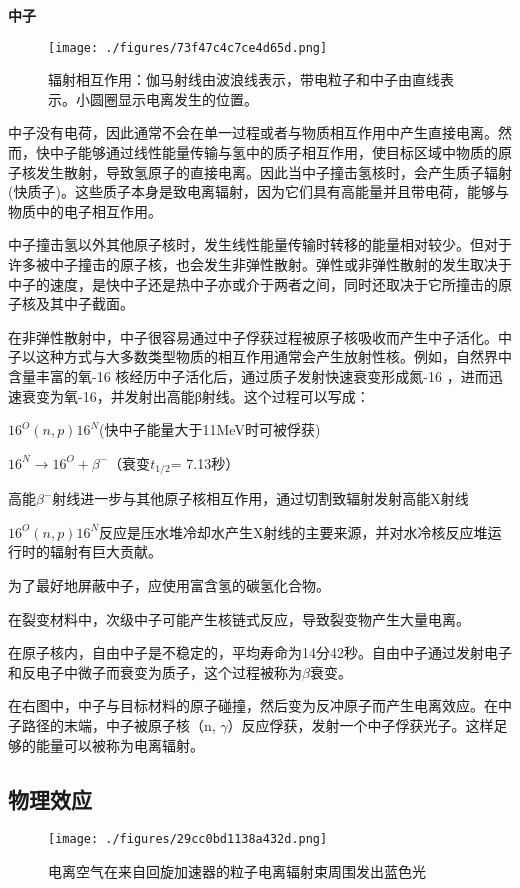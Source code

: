 \textbf{中子}

\begin{figure}[ht]
\centering
\texttt{[image: ./figures/73f47c4c7ce4d65d.png]}
\caption{辐射相互作用：伽马射线由波浪线表示，带电粒子和中子由直线表示。小圆圈显示电离发生的位置。} \label{fig_DLFS_5}
\end{figure}
中子没有电荷，因此通常不会在单一过程或者与物质相互作用中产生直接电离。然而，快中子能够通过线性能量传输与氢中的质子相互作用，使目标区域中物质的原子核发生散射，导致氢原子的直接电离。因此当中子撞击氢核时，会产生质子辐射(快质子)。这些质子本身是致电离辐射，因为它们具有高能量并且带电荷，能够与物质中的电子相互作用。

中子撞击氢以外其他原子核时，发生线性能量传输时转移的能量相对较少。但对于许多被中子撞击的原子核，也会发生非弹性散射。弹性或非弹性散射的发生取决于中子的速度，是快中子还是热中子亦或介于两者之间，同时还取决于它所撞击的原子核及其中子截面。

在非弹性散射中，中子很容易通过中子俘获过程被原子核吸收而产生中子活化。中子以这种方式与大多数类型物质的相互作用通常会产生放射性核。例如，自然界中含量丰富的氧-16 核经历中子活化后，通过质子发射快速衰变形成氮-16 ，进而迅速衰变为氧-16，并发射出高能β射线。这个过程可以写成：

$16^O (n,p)16^N$(快中子能量大于11MeV时可被俘获)

$16^N \to 16^O + \beta^-$（衰变$t_{1/2}$= 7.13秒）

高能$\beta^-$射线进一步与其他原子核相互作用，通过切割致辐射发射高能X射线

$16^O (n,p)16^N$反应是压水堆冷却水产生X射线的主要来源，并对水冷核反应堆运行时的辐射有巨大贡献。

为了最好地屏蔽中子，应使用富含氢的碳氢化合物。

在裂变材料中，次级中子可能产生核链式反应，导致裂变物产生大量电离。

在原子核内，自由中子是不稳定的，平均寿命为14分42秒。自由中子通过发射电子和反电子中微子而衰变为质子，这个过程被称为$\beta$衰变。

在右图中，中子与目标材料的原子碰撞，然后变为反冲原子而产生电离效应。在中子路径的末端，中子被原子核（n, $\gamma$）反应俘获，发射一个中子俘获光子。这样足够的能量可以被称为电离辐射。

\subsection{物理效应}
\begin{figure}[ht]
\centering
\texttt{[image: ./figures/29cc0bd1138a432d.png]}
\caption{电离空气在来自回旋加速器的粒子电离辐射束周围发出蓝色光} \label{fig_DLFS_6}
\end{figure}


